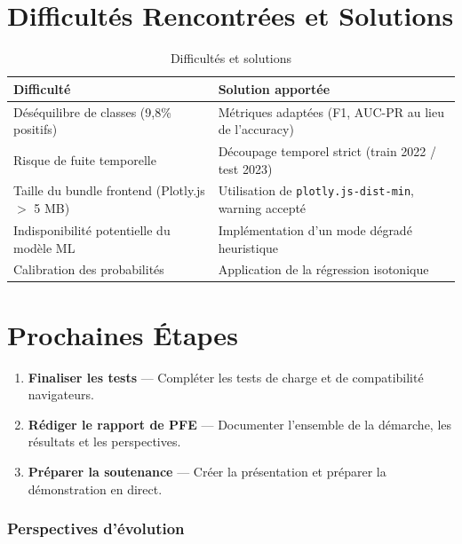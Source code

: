 \documentclass[a4paper,12pt]{report}
\begin{document}
\chapter{Difficultés Rencontrées et Solutions}

\begin{table}[h!]
\centering
\renewcommand{\arraystretch}{1.4}
\begin{tabularx}{\textwidth}{|X|X|}
\hline
\rowcolor{bpmblue!10}
\textbf{Difficulté} & \textbf{Solution apportée} \\
\hline
Déséquilibre de classes (9,8\% positifs) & Métriques adaptées (F1, AUC-PR au lieu de l'accuracy) \\
\hline
Risque de fuite temporelle & Découpage temporel strict (train 2022 / test 2023) \\
\hline
Taille du bundle frontend (Plotly.js $>$ 5 MB) & Utilisation de \texttt{plotly.js-dist-min}, warning accepté \\
\hline
Indisponibilité potentielle du modèle ML & Implémentation d'un mode dégradé heuristique \\
\hline
Calibration des probabilités & Application de la régression isotonique \\
\hline
\end{tabularx}
\caption{Difficultés et solutions}
\end{table}

\chapter{Prochaines Étapes}

\begin{enumerate}
    \item \textbf{Finaliser les tests} — Compléter les tests de charge et de compatibilité navigateurs.
    \item \textbf{Rédiger le rapport de PFE} — Documenter l'ensemble de la démarche, les résultats et les perspectives.
    \item \textbf{Préparer la soutenance} — Créer la présentation et préparer la démonstration en direct.
\end{enumerate}

\subsection*{Perspectives d'évolution}
\end{document}
